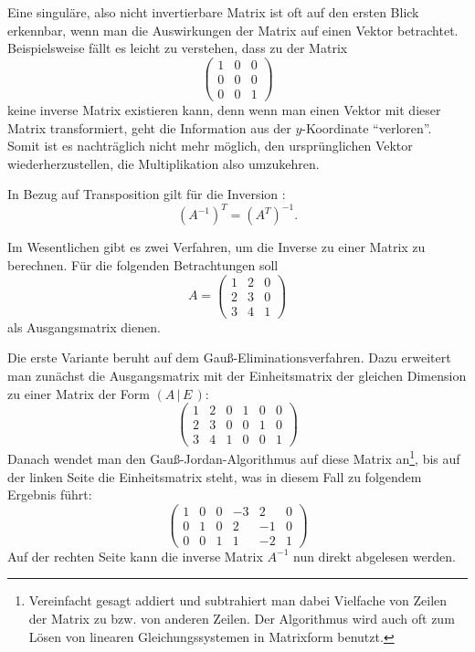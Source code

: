 Eine singuläre, also nicht invertierbare Matrix ist oft auf den ersten Blick erkennbar, wenn man die Auswirkungen der Matrix auf einen Vektor betrachtet. Beispielsweise fällt es leicht zu verstehen, dass zu der Matrix
\begin{equation}
 \begin{pmatrix}
  1 & 0 & 0 \\
  0 & 0 & 0 \\
  0 & 0 & 1
 \end{pmatrix}
\end{equation}
keine inverse Matrix existieren kann, denn wenn man einen Vektor mit dieser Matrix transformiert, geht die Information aus der $y$-Koordinate \enquote{verloren}. Somit ist es nachträglich nicht mehr möglich, den ursprünglichen Vektor wiederherzustellen, die Multiplikation also umzukehren.

In Bezug auf Transposition gilt für die Inversion :
\begin{equation}
 (A^{-1})^T = (A^T)^{-1}.
\end{equation}

Im Wesentlichen gibt es zwei Verfahren, um die Inverse zu einer Matrix zu berechnen. Für die folgenden Betrachtungen soll
\begin{equation*}
 A = \begin{pmatrix}
  1 & 2 & 0 \\
  2 & 3 & 0 \\
  3 & 4 & 1
 \end{pmatrix}
\end{equation*}
als Ausgangsmatrix dienen.

Die erste Variante beruht auf dem Gauß-Eliminationsverfahren. Dazu erweitert man zunächst die Ausgangsmatrix mit der Einheitsmatrix der gleichen Dimension zu einer Matrix der Form $\left( A \, | \, E \, \right)$:
\begin{equation}
 \left(\begin{array}{ccc|ccc}
    1 & 2 & 0 &  1 & 0 & 0 \\
    2 & 3 & 0 &  0 & 1 & 0 \\
    3 & 4 & 1 &  0 & 0 & 1
  \end{array}\right)
\end{equation}
Danach wendet man den Gauß-Jordan-Algorithmus auf diese Matrix an\footnote{Vereinfacht gesagt addiert und subtrahiert man dabei Vielfache von Zeilen der Matrix zu bzw. von anderen Zeilen. Der Algorithmus wird auch oft zum Lösen von linearen Gleichungssystemen in Matrixform benutzt.}, bis auf der linken Seite die Einheitsmatrix steht, was in diesem Fall zu folgendem Ergebnis führt:
\begin{equation}
  \left(\begin{array}{ccc|ccc}
    1 & 0 & 0  & -3 & 2 & 0 \\
    0 & 1 & 0  & 2 & -1 & 0 \\
    0 & 0 & 1  & 1 & -2 & 1
  \end{array}\right)
\end{equation}
Auf der rechten Seite kann die inverse Matrix $A^{-1}$ nun direkt abgelesen werden.

